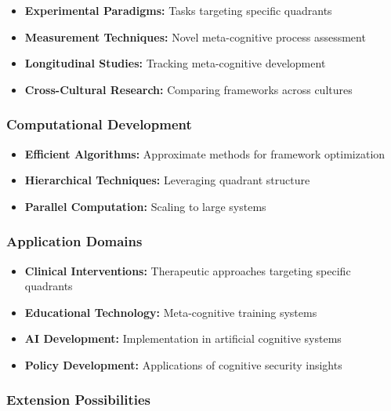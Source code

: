 \documentclass[
]{article}
\providecommand{\tightlist}{%
  \setlength{\itemsep}{0pt}\setlength{\parskip}{0pt}}
\begin{document}
\begin{itemize}
\tightlist
\item
  \textbf{Experimental Paradigms:} Tasks targeting specific quadrants
\item
  \textbf{Measurement Techniques:} Novel meta-cognitive process
  assessment
\item
  \textbf{Longitudinal Studies:} Tracking meta-cognitive development
\item
  \textbf{Cross-Cultural Research:} Comparing frameworks across cultures
\end{itemize}

\subsubsection{Computational
Development}\label{computational-development}

\begin{itemize}
\tightlist
\item
  \textbf{Efficient Algorithms:} Approximate methods for framework
  optimization
\item
  \textbf{Hierarchical Techniques:} Leveraging quadrant structure
\item
  \textbf{Parallel Computation:} Scaling to large systems
\end{itemize}

\subsubsection{Application Domains}\label{application-domains}

\begin{itemize}
\tightlist
\item
  \textbf{Clinical Interventions:} Therapeutic approaches targeting
  specific quadrants
\item
  \textbf{Educational Technology:} Meta-cognitive training systems
\item
  \textbf{AI Development:} Implementation in artificial cognitive
  systems
\item
  \textbf{Policy Development:} Applications of cognitive security
  insights
\end{itemize}

\subsubsection{Extension Possibilities}\label{extension-possibilities}
\end{document}
